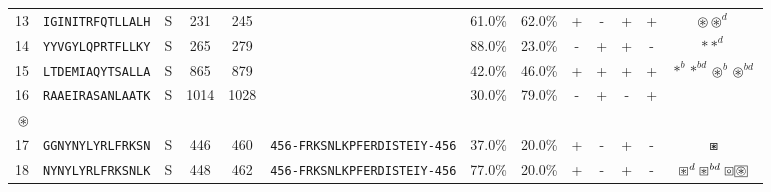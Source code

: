 \begin{tabular}{rcccccccccccc}
13 &  \texttt{IGINITRFQTLLALH} &       S &    231 &   245 &                                                                  &                          61.0\% &                           62.0\% &          + &           - &          + &           + &                                                                                                         $ \circledast \circledast^d $ \\
14 &  \texttt{YYVGYLQPRTFLLKY} &       S &    265 &   279 &                                                                  &                          88.0\% &                           23.0\% &          - &           + &          + &           - &                                                                                                                       $ \ast \ast^d $ \\
15 &  \texttt{LTDEMIAQYTSALLA} &       S &    865 &   879 &                                                                  &                          42.0\% &                           46.0\% &          + &           + &          + &           + &                                                                                   $ \ast^b \ast^{bd} \circledast^b \circledast^{bd} $ \\
16 &  \texttt{RAAEIRASANLAATK} &       S &   1014 &  1028 &                                                                  &                          30.0\% &                           79.0\% &          - &           + &          - &           + &                                                                 \Centerstack{  $\circ \circ^b \circ^d \circ^{bd}$ \\  $\circledast$ } \\
17 &  \texttt{GGNYNYLYRLFRKSN} &       S &    446 &   460 &  \texttt{{\scriptsize 456-}FRKSNLKPFERDISTEIY{\scriptsize -456}} &                          37.0\% &                           20.0\% &          + &           - &          + &           - &                                                                                                                           $ \boxast $ \\
18 &  \texttt{NYNYLYRLFRKSNLK} &       S &    448 &   462 &  \texttt{{\scriptsize 456-}FRKSNLKPFERDISTEIY{\scriptsize -456}} &                          77.0\% &                           20.0\% &          + &           - &          + &           - &                                                 $ \boxast^d \boxast^{bd} \boxcircle \setlength{\fboxsep}{0.5pt} \boxed{\circledast} $ \\

\end{tabular}

